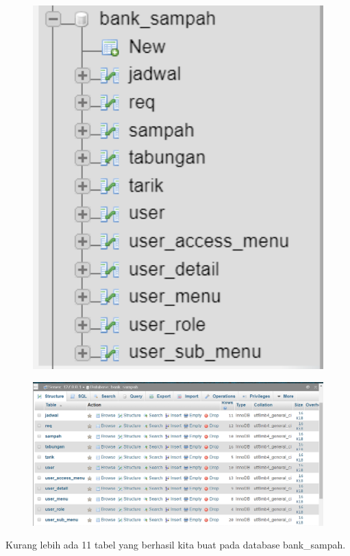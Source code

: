 \begin{figure}[H]
\centering
\includegraphics[width=1\textwidth]{figures/database/15.png}
\end{figure}

\begin{figure}[H]
\centering
\includegraphics[width=1\textwidth]{figures/database/16.png}
\end{figure}

\noindent
Kurang lebih ada 11 tabel yang berhasil kita buat pada database bank\_sampah.